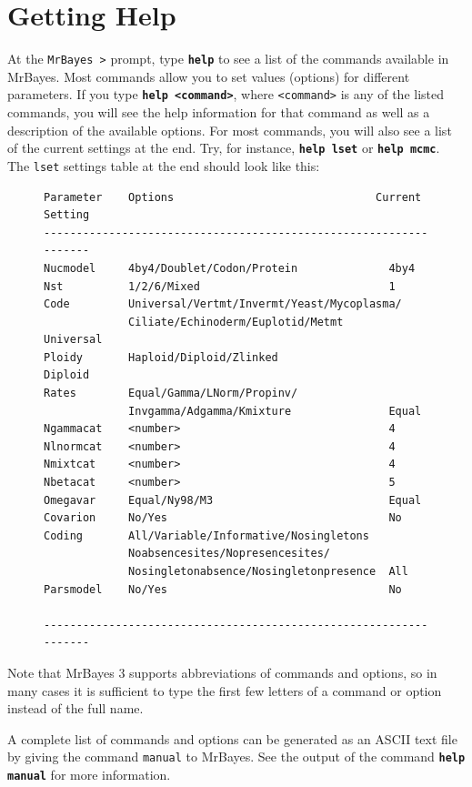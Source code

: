 \documentclass[12pt]{book}
\newcommand{\ttt}[1]{\texttt{#1}}
\newcommand{\tb}[1]{\ttt{\textbf{#1}}}
\begin{document}
\section{Getting Help}
\label{gettingHelp}

At the \texttt{MrBayes >} prompt, type \tb{help} to see a list of the commands available in
MrBayes.  Most commands allow you to set values (options) for different parameters. If you type
\tb{help <command>}, where \texttt{<command>} is any of the listed commands, you will see the help
information for that command as well as a description of the available options. For most commands,
you will also see a list of the current settings at the end. Try, for instance, \tb{help lset} or
\tb{help mcmc}. The \texttt{lset} settings table at the end should look like this:

\begin{figure}[h]
\centering
\begin{BVerbatim}
Parameter    Options                               Current Setting
------------------------------------------------------------------
Nucmodel     4by4/Doublet/Codon/Protein              4by4
Nst          1/2/6/Mixed                             1
Code         Universal/Vertmt/Invermt/Yeast/Mycoplasma/
             Ciliate/Echinoderm/Euplotid/Metmt       Universal
Ploidy       Haploid/Diploid/Zlinked                 Diploid
Rates        Equal/Gamma/LNorm/Propinv/
             Invgamma/Adgamma/Kmixture               Equal
Ngammacat    <number>                                4
Nlnormcat    <number>                                4
Nmixtcat     <number>                                4
Nbetacat     <number>                                5
Omegavar     Equal/Ny98/M3                           Equal
Covarion     No/Yes                                  No
Coding       All/Variable/Informative/Nosingletons
             Noabsencesites/Nopresencesites/
             Nosingletonabsence/Nosingletonpresence  All
Parsmodel    No/Yes                                  No

------------------------------------------------------------------
\end{BVerbatim}
\end{figure}

Note that MrBayes 3 supports abbreviations of commands and options, so in many cases it is
sufficient to type the first few letters of a command or option instead of the full name.

A complete list of commands and options can be generated as an ASCII text file by giving the
command \texttt{manual} to MrBayes. See the output of the command \tb{help manual} for more
information.
\end{document}
